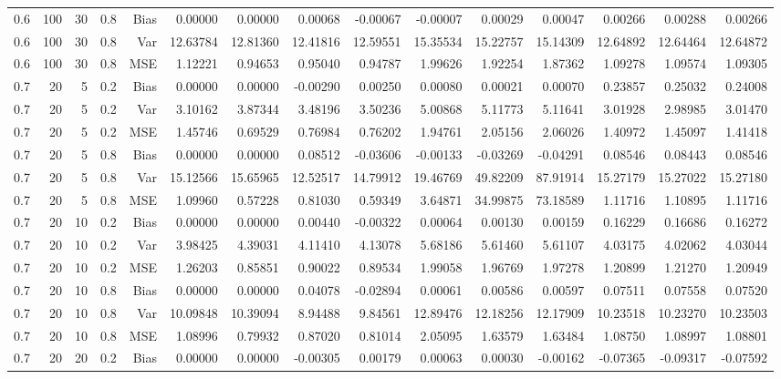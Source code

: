 \begin{table}[!htbp]
\begin{tabular}{lrrrrrrrrrrrrrr}
0.6 & 100 & 30 & 0.8 & Bias & 0.00000 & 0.00000 & 0.00068 & -0.00067 & -0.00007 & 0.00029 & 0.00047 & 0.00266 & 0.00288 & 0.00266 \\
0.6 & 100 & 30 & 0.8 & Var & 12.63784 & 12.81360 & 12.41816 & 12.59551 & 15.35534 & 15.22757 & 15.14309 & 12.64892 & 12.64464 & 12.64872 \\
0.6 & 100 & 30 & 0.8 & MSE & 1.12221 & 0.94653 & 0.95040 & 0.94787 & 1.99626 & 1.92254 & 1.87362 & 1.09278 & 1.09574 & 1.09305 \\
0.7 &  20 &  5 & 0.2 & Bias & 0.00000 & 0.00000 & -0.00290 & 0.00250 & 0.00080 & 0.00021 & 0.00070 & 0.23857 & 0.25032 & 0.24008 \\
0.7 &  20 &  5 & 0.2 & Var & 3.10162 & 3.87344 & 3.48196 & 3.50236 & 5.00868 & 5.11773 & 5.11641 & 3.01928 & 2.98985 & 3.01470 \\
0.7 &  20 &  5 & 0.2 & MSE & 1.45746 & 0.69529 & 0.76984 & 0.76202 & 1.94761 & 2.05156 & 2.06026 & 1.40972 & 1.45097 & 1.41418 \\
0.7 &  20 &  5 & 0.8 & Bias & 0.00000 & 0.00000 & 0.08512 & -0.03606 & -0.00133 & -0.03269 & -0.04291 & 0.08546 & 0.08443 & 0.08546 \\
0.7 &  20 &  5 & 0.8 & Var & 15.12566 & 15.65965 & 12.52517 & 14.79912 & 19.46769 & 49.82209 & 87.91914 & 15.27179 & 15.27022 & 15.27180 \\
0.7 &  20 &  5 & 0.8 & MSE & 1.09960 & 0.57228 & 0.81030 & 0.59349 & 3.64871 & 34.99875 & 73.18589 & 1.11716 & 1.10895 & 1.11716 \\
0.7 &  20 & 10 & 0.2 & Bias & 0.00000 & 0.00000 & 0.00440 & -0.00322 & 0.00064 & 0.00130 & 0.00159 & 0.16229 & 0.16686 & 0.16272 \\
0.7 &  20 & 10 & 0.2 & Var & 3.98425 & 4.39031 & 4.11410 & 4.13078 & 5.68186 & 5.61460 & 5.61107 & 4.03175 & 4.02062 & 4.03044 \\
0.7 &  20 & 10 & 0.2 & MSE & 1.26203 & 0.85851 & 0.90022 & 0.89534 & 1.99058 & 1.96769 & 1.97278 & 1.20899 & 1.21270 & 1.20949 \\
0.7 &  20 & 10 & 0.8 & Bias & 0.00000 & 0.00000 & 0.04078 & -0.02894 & 0.00061 & 0.00586 & 0.00597 & 0.07511 & 0.07558 & 0.07520 \\
0.7 &  20 & 10 & 0.8 & Var & 10.09848 & 10.39094 & 8.94488 & 9.84561 & 12.89476 & 12.18256 & 12.17909 & 10.23518 & 10.23270 & 10.23503 \\
0.7 &  20 & 10 & 0.8 & MSE & 1.08996 & 0.79932 & 0.87020 & 0.81014 & 2.05095 & 1.63579 & 1.63484 & 1.08750 & 1.08997 & 1.08801 \\
0.7 &  20 & 20 & 0.2 & Bias & 0.00000 & 0.00000 & -0.00305 & 0.00179 & 0.00063 & 0.00030 & -0.00162 & -0.07365 & -0.09317 & -0.07592 \\

\end{tabular}
\end{table}
